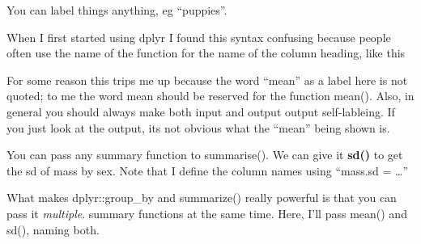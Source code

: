 \documentclass[]{book}
\newenvironment{Shaded}{\begin{snugshade}}{\end{snugshade}}
\newcommand{\KeywordTok}[1]{\textcolor[rgb]{0.13,0.29,0.53}{\textbf{#1}}}
\newcommand{\DataTypeTok}[1]{\textcolor[rgb]{0.13,0.29,0.53}{#1}}
\newcommand{\StringTok}[1]{\textcolor[rgb]{0.31,0.60,0.02}{#1}}
\newcommand{\CommentTok}[1]{\textcolor[rgb]{0.56,0.35,0.01}{\textit{#1}}}
\newcommand{\OperatorTok}[1]{\textcolor[rgb]{0.81,0.36,0.00}{\textbf{#1}}}
\newcommand{\NormalTok}[1]{#1}
\theoremstyle{definition}
\theoremstyle{definition}
\theoremstyle{definition}
\theoremstyle{remark}
\begin{document}
You can label things anything, eg ``puppies''.

\begin{Shaded}
\end{Shaded}

When I first started using dplyr I found this syntax confusing because
people often use the name of the function for the name of the column
heading, like this

\begin{Shaded}
\end{Shaded}

For some reason this trips me up because the word ``mean'' as a label
here is not quoted; to me the word mean should be reserved for the
function mean(). Also, in general you should always make both input and
output output self-lableing. If you just look at the output, its not
obvious what the ``mean'' being shown is.

You can pass any summary function to summarise(). We can give it
\textbf{sd()} to get the sd of mass by sex. Note that I define the
column names using ``mass.sd = \ldots{}''

\begin{Shaded}
\end{Shaded}

What makes dplyr::group\_by and summarize() really powerful is that you
can pass it \emph{multiple}. summary functions at the same time. Here,
I'll pass mean() and sd(), naming both.
\end{document}

